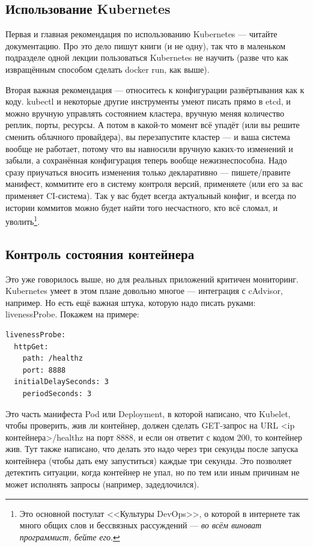 \documentclass[a5paper]{article}
\begin{document}
\subsection{Использование Kubernetes}

Первая и главная рекомендация по использованию Kubernetes --- читайте документацию. Про это дело пишут книги (и не одну), так что в маленьком подразделе одной лекции пользоваться Kubernetes не научить (разве что как извращённым способом сделать docker run, как выше). 

Вторая важная рекомендация --- относитесь к конфигурации развёртывания как к коду. kubectl и некоторые другие инструменты умеют писать прямо в etcd, и можно вручную управлять состоянием кластера, вручную меняя количество реплик, порты, ресурсы. А потом в какой-то момент всё упадёт (или вы решите сменить облачного провайдера), вы перезапустите кластер --- и ваша система вообще не работает, потому что вы навносили вручную каких-то изменений и забыли, а сохранённая конфигурация теперь вообще нежизнеспособна. Надо сразу приучаться вносить изменения только декларативно --- пишете/правите манифест, коммитите его в систему контроля версий, применяете (или его за вас применяет CI-система). Так у вас будет всегда актуальный конфиг, и всегда по истории коммитов можно будет найти того несчастного, кто всё сломал, и уволить\footnote{Это основной постулат <<Культуры DevOps>>, о которой в интернете так много общих слов и бессвязных рассуждений --- \emph{во всём виноват программист, бейте его}.}.

\subsection{Контроль состояния контейнера}

Это уже говорилось выше, но для реальных приложений критичен мониторинг. Kubernetes умеет в этом плане довольно многое --- интеграция с cAdvisor, например. Но есть ещё важная штука, которую надо писать руками: livenessProbe. Покажем на примере:

\begin{verbatim}
livenessProbe:
  httpGet:
    path: /healthz
    port: 8888
  initialDelaySeconds: 3
    periodSeconds: 3
\end{verbatim}

Это часть манифеста Pod или Deployment, в которой написано, что Kubelet, чтобы проверить, жив ли контейнер, должен сделать GET-запрос на URL <ip контейнера>/healthz на порт 8888, и если он ответит с кодом 200, то контейнер жив. Тут также написано, что делать это надо через три секунды после запуска контейнера (чтобы дать ему запуститься) каждые три секунды. Это позволяет детектить ситуации, когда контейнер не упал, но по тем или иным причинам не может исполнять запросы (например, задедлочился).
\end{document}
